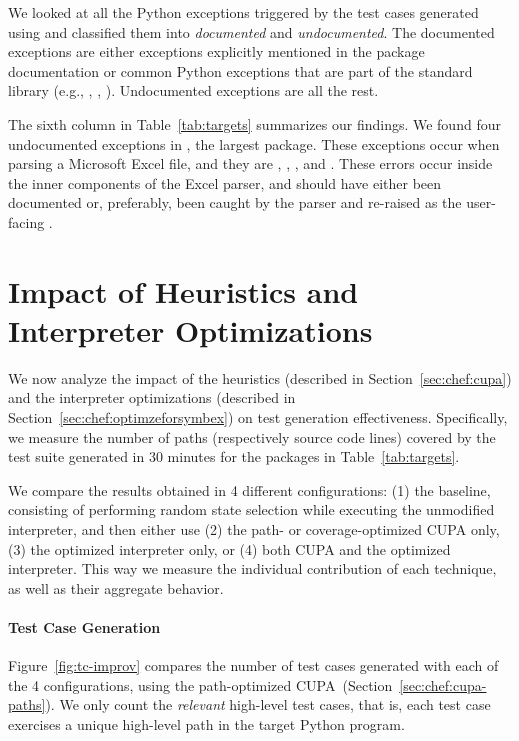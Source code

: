 We looked at all the Python exceptions triggered by the test cases generated using \chef and classified them into \emph{documented} and \emph{undocumented}.  The documented exceptions are either exceptions explicitly mentioned in the package documentation or common Python exceptions that are part of the standard library (e.g., , , ).  Undocumented exceptions are all the rest.

The sixth column in Table~\ref{tab:targets} summarizes our findings.  We found four undocumented exceptions in , the largest package.  These exceptions occur when parsing a Microsoft Excel file, and they are , , , and .  These errors occur inside the inner components of the Excel parser, and should have either been documented or, preferably, been caught by the parser and re-raised as the user-facing .

\section{Impact of \cupa Heuristics and Interpreter Optimizations}
\label{sec:sub:perf-cupa}

We now analyze the impact of the \cupa heuristics (described in Section~\ref{sec:chef:cupa}) and the interpreter optimizations (described in Section~\ref{sec:chef:optimzeforsymbex}) on test generation effectiveness.  Specifically, we measure the number of paths (respectively source code lines) covered by the test suite generated in 30 minutes for the packages in Table~\ref{tab:targets}.

We compare the results obtained in 4 different configurations: (1) the baseline, consisting of performing random state selection while executing the unmodified interpreter, and then either use (2) the path- or coverage-optimized CUPA only, (3) the optimized interpreter only, or (4) both CUPA and the optimized interpreter.  This way we measure the individual contribution of each technique, as well as their aggregate behavior.

\paragraph{Test Case Generation}

Figure~\ref{fig:tc-improv} compares the number of test cases generated with each of the 4 \chef configurations, using the path-optimized CUPA~(Section~\ref{sec:chef:cupa-paths}).  We only count the \textit{relevant} high-level test cases, that is, each test case exercises a unique high-level path in the target Python program.

